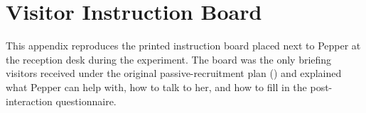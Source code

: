 \chapter{Visitor Instruction Board}
\label{ch:instructions}

This appendix reproduces the printed instruction board placed next to Pepper at the reception desk during the experiment.
The board was the only briefing visitors received under the original passive-recruitment plan () and explained what Pepper can help with, how to talk to her, and how to fill in the post-interaction questionnaire.


